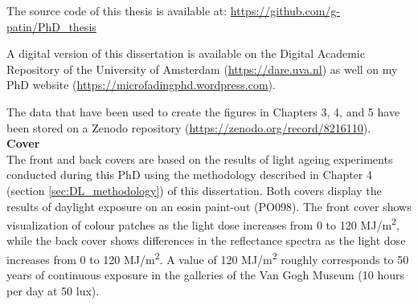 The source code of this thesis is available at: \url{https://github.com/g-patin/PhD_thesis}

A digital version of this dissertation is available on the Digital Academic Repository of the University of Amsterdam (\url{https://dare.uva.nl}) as well on my PhD website (\url{https://microfadingphd.wordpress.com}). 

The data that have been used to create the figures in Chapters 3, 4, and 5 have been stored on a Zenodo repository (\url{https://zenodo.org/record/8216110}). \\

\textbf{Cover} \\
The front and back covers are based on the results of light ageing experiments conducted during this PhD using the methodology described in Chapter 4 (section \ref{sec:DL_methodology}) of this dissertation. Both covers display the results of daylight exposure on an eosin paint-out (PO098). The front cover shows visualization of colour patches as the light dose increases from 0 to 120 MJ/m\textsuperscript{2}, while the back cover shows differences in the reflectance spectra as the light dose increases from 0 to 120 MJ/m\textsuperscript{2}. A value of 120 MJ/m\textsuperscript{2} roughly corresponds to 50 years of continuous exposure in the galleries of the Van Gogh Museum (10 hours per day at 50 lux).






           
    






